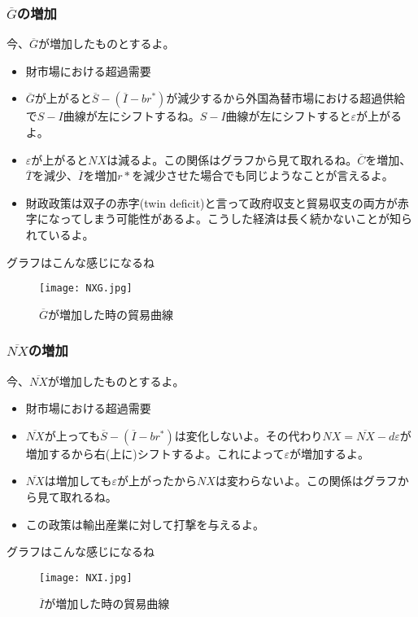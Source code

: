 \documentclass[a4paper, 12pt]{article}
\begin{document}
\subsubsection{$\overline{G}$の増加}
今、$\overline{G}$が増加したものとするよ。
\begin{itemize}
  \item 財市場における超過需要
  \item $\overline{G}$が上がると$\overline{S}-(\overline{I}-br^*)$が減少するから外国為替市場における超過供給で$S-I$曲線が左にシフトするね。$S-I$曲線が左にシフトすると$\varepsilon$が上がるよ。
  \item $\varepsilon$が上がると$NX$は減るよ。この関係はグラフから見て取れるね。$\overline{C}$を増加、$\overline{T}$を減少、$\overline{I}$を増加$r*$を減少させた場合でも同じようなことが言えるよ。
  \item 財政政策は双子の赤字(twin deficit)と言って政府収支と貿易収支の両方が赤字になってしまう可能性があるよ。こうした経済は長く続かないことが知られているよ。
\end{itemize}
グラフはこんな感じになるね
\begin{figure}[h]
\begin{center}
\texttt{[image: NXG.jpg]}
\caption{$\overline{G}$が増加した時の貿易曲線}
\label{}
\end{center}
\end{figure}

\subsubsection{$\overline{NX}$の増加}
今、$\overline{NX}$が増加したものとするよ。
\begin{itemize}
  \item 財市場における超過需要
  \item $\overline{NX}$が上っても$\overline{S}-(\overline{I}-br^*)$は変化しないよ。その代わり$NX=\overline{NX}-d\varepsilon$が増加するから右(上に)シフトするよ。これによって$\varepsilon$が増加するよ。
  \item $\overline{NX}$は増加しても$\varepsilon$が上がったから$NX$は変わらないよ。この関係はグラフから見て取れるね。
  \item この政策は輸出産業に対して打撃を与えるよ。
\end{itemize}
グラフはこんな感じになるね
\begin{figure}[h]
\begin{center}
\texttt{[image: NXI.jpg]}
\caption{$\overline{I}$が増加した時の貿易曲線}
\label{}
\end{center}
\end{figure}
\end{document}
